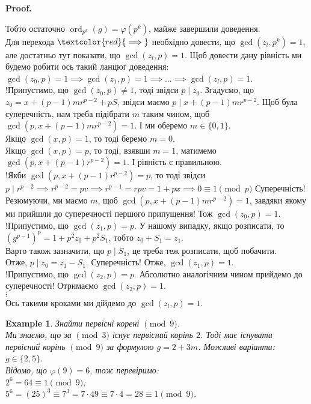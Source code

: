 \documentclass[a4paper, 14pt]{extarticle}
\makeatletter
\theoremstyle{theoremdd}
\theoremstyle{theoremdd}
\theoremstyle{theoremdd}
\theoremstyle{theoremdd}
\newtheorem{example}[theorem]{Example}
\theoremstyle{theoremdd}
\theoremstyle{theoremdd}
\theoremstyle{theoremdd}
\theoremstyle{theoremdd}
\def\qed{$\blacksquare$}
\renewenvironment{proof}[1][Proof.\\]{\par
\pushQED{\hfill \qed}%
\normalfont \topsep6\p@\@plus6\p@\relax
\trivlist
\item\relax
{\bfseries
#1\@addpunct{.}}\hspace\labelsep\ignorespaces
}{%
\popQED\endtrivlist\@endpefalse
}
\DeclareMathOperator{\ord}{ord}
\makeatother
\begin{document}
\begin{proof}
Тобто остаточно $\ord_{p^k} (g) = \varphi(p^k)$, майже завершили доведення.
\bigskip \\
Для перехода $\textcolor{red}{\implies}$ необхідно довести, що $\gcd(z_l,p^k) = 1$, але достатньо тут показати, що $\gcd(z_l,p) = 1$. Щоб довести дану рівність ми будемо робити ось такий ланцюг доведення:\\
$\gcd(z_0,p) = 1 \implies \gcd(z_1,p) = 1 \implies \dots \implies \gcd(z_l,p)=1$.\\
!Припустимо, що $\gcd(z_0,p) \neq 1$, тоді звідси $p \mid z_0$. Згадуємо, що\\
$z_0 = x + (p-1)mr^{p-2} + pS$, звідси маємо $p \mid x+(p-1)mr^{p-2}$. Щоб була суперечність, нам треба підібрати $m$ таким чином, щоб \\ $\gcd(p,x+(p-1)mr^{p-2}) = 1$. І ми оберемо $m \in \{0,1\}$.\\
Якщо $\gcd(x,p) = 1$, то тоді беремо $m = 0$.\\
Якщо $\gcd(x,p) = p$, то тоді, взявши $m =1$, матимемо \\ $\gcd(p,x+(p-1)r^{p-2}) = 1$. І рівність є правильною. \\
!Якби $\gcd(p,x+(p-1)r^{p-2}) = p$, то тоді звідси $p \mid r^{p-2} \implies r^{p-2} = pv \implies r^{p-1} = rpv = 1 + px \implies 0 \equiv 1 \pmod p$ Суперечність!\\
Резюмуючи, ми маємо $m$, щоб $\gcd(p,x+(p-1)mr^{p-2}) = 1$, завдяки якому ми прийшли до суперечності першого припущення! Тож $\gcd(z_0,p) = 1$.
\bigskip \\
!Припустимо, що $\gcd(z_1,p) = p$. У нашому випадку, якщо розписати, то\\
$(g^{p-1})^p = 1 + p^2 z_0 + p^2 S_1$, тобто $z_0 + S_1 = z_1$.\\
Варто також зазначити, що $p \mid S_1$, це треба теж розписати, щоб побачити.\\
Отже, $p \mid z_0 = z_1 - S_1$. Суперечність! Отже, $\gcd(z_1,p) = 1$.\\
!Припустимо, що $\gcd(z_2,p) = p$. Абсолютно аналогічним чином прийдемо до суперечності! Отримаємо $\gcd(z_2,p) = 1$.\\
$\vdots$\\
Ось такими кроками ми дійдемо до $\gcd(z_l,p) = 1$.
\end{proof}

\begin{example}
Знайти первісні корені $\!\! \pmod 9$.\\
Ми знаємо, що за $\!\! \pmod 3$ існує первісний корінь $2$. Тоді має існувати первісний корінь $\!\! \pmod 9$ за формулою $g = 2 + 3m$. Можливі варіанти: $g \in \{2,5\}$.\\
Відомо, що $\varphi(9) = 6$, тож перевіримо:\\
$2^6 = 64 \equiv 1 \pmod 9$;\\
$5^6 = (25)^3 \equiv 7^3 = 7 \cdot 49 \equiv 7 \cdot 4 = 28 \equiv 1 \pmod 9$.
\end{example}
\end{document}
